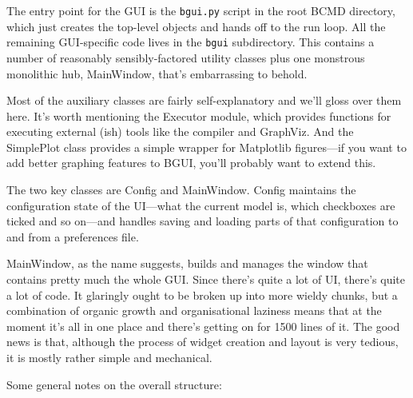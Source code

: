\documentclass[a4paper,11pt]{article}
\begin{document}
The entry point for the GUI is the \texttt{bgui.py} script in the root BCMD directory, which just creates the top-level objects and hands off to the run loop. All the remaining GUI-specific code lives in the \texttt{bgui} subdirectory. This contains a number of reasonably sensibly-factored utility classes plus one monstrous monolithic hub, MainWindow, that's embarrassing to behold.

Most of the auxiliary classes are fairly self-explanatory and we'll gloss over them here. It's worth mentioning the Executor module, which provides functions for executing external (ish) tools like the compiler and GraphViz. And the SimplePlot class provides a simple wrapper for Matplotlib figures---if you want to add better graphing features to BGUI, you'll probably want to extend this.

The two key classes are Config and MainWindow. Config maintains the configuration state of the UI---what the current model is, which checkboxes are ticked and so on---and handles saving and loading parts of that configuration to and from a preferences file.

MainWindow, as the name suggests, builds and manages the window that contains pretty much the whole GUI. Since there's quite a lot of UI, there's quite a lot of code. It glaringly ought to be broken up into more wieldy chunks, but a combination of organic growth and organisational laziness means that at the moment it's all in one place and there's getting on for 1500 lines of it. The good news is that, although the process of widget creation and layout is very tedious, it is mostly rather simple and mechanical.

Some general notes on the overall structure:
\end{document}
